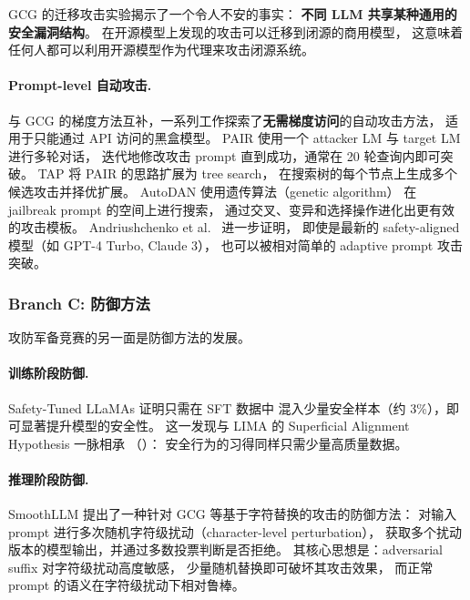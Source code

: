 \begin{problembox}
GCG 的迁移攻击实验揭示了一个令人不安的事实：
\textbf{不同 LLM 共享某种通用的安全漏洞结构}。
在开源模型上发现的攻击可以迁移到闭源的商用模型，
这意味着任何人都可以利用开源模型作为代理来攻击闭源系统。
\end{problembox}

\paragraph{Prompt-level 自动攻击.}
与 GCG 的梯度方法互补，一系列工作探索了\textbf{无需梯度访问}的自动攻击方法，
适用于只能通过 API 访问的黑盒模型。
PAIR \cite{chao2023pair} 使用一个 attacker LM 与 target LM 进行多轮对话，
迭代地修改攻击 prompt 直到成功，通常在 20 轮查询内即可突破。
TAP \cite{mehrotra2023tap} 将 PAIR 的思路扩展为 tree search，
在搜索树的每个节点上生成多个候选攻击并择优扩展。
AutoDAN \cite{liu2023autodan} 使用遗传算法（genetic algorithm）
在 jailbreak prompt 的空间上进行搜索，
通过交叉、变异和选择操作进化出更有效的攻击模板。
Andriushchenko et al.\ \cite{andriushchenko2024adaptive} 进一步证明，
即使是最新的 safety-aligned 模型（如 GPT-4 Turbo, Claude 3），
也可以被相对简单的 adaptive prompt 攻击突破。

\subsubsection{Branch C: 防御方法}
\label{sec:t3-defense}

攻防军备竞赛的另一面是防御方法的发展。

\paragraph{训练阶段防御.}
Safety-Tuned LLaMAs \cite{bianchi2023safetytuned} 证明只需在 SFT 数据中
混入少量安全样本（约 3\%），即可显著提升模型的安全性。
这一发现与 LIMA \cite{zhou2023lima} 的 Superficial Alignment Hypothesis 一脉相承
（）：
安全行为的习得同样只需少量高质量数据。

\paragraph{推理阶段防御.}
SmoothLLM \cite{robey2023smoothllm} 提出了一种针对 GCG 等基于字符替换的攻击的防御方法：
对输入 prompt 进行多次随机字符级扰动（character-level perturbation），
获取多个扰动版本的模型输出，并通过多数投票判断是否拒绝。
其核心思想是：adversarial suffix 对字符级扰动高度敏感，
少量随机替换即可破坏其攻击效果，
而正常 prompt 的语义在字符级扰动下相对鲁棒。

